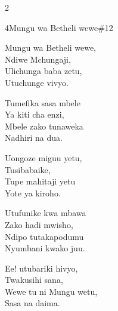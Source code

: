 \begin{multicols}{2}
\begin{hymn}{4}{Mungu wa Betheli wewe}{\#12}
\begin{stanza}
Mungu wa Betheli wewe,\\
Ndiwe Mchungaji,\\
Ulichunga baba zetu,\\
Utuchunge vivyo.
\end{stanza}
\begin{stanza}
Tumefika sasa mbele\\
Ya kiti cha enzi,\\
Mbele zako tunaweka\\
Nadhiri na dua.
\end{stanza}
\begin{stanza}
Uongoze miguu yetu,\\
Tusibabaike,\\
Tupe mahitaji yetu\\
Yote ya kiroho.
\end{stanza}
\begin{stanza}
Utufunike kwa mbawa\\
Zako hadi mwisho,\\
Ndipo tutakapodumu\\
Nyumbani kwako juu.
\end{stanza}
\begin{stanza}
Ee! utubariki hivyo,\\
Twakusihi sana,\\
Wewe tu ni Mungu wetu,\\
Sasa na daima.
\end{stanza}
\end{hymn}


\end{multicols}

